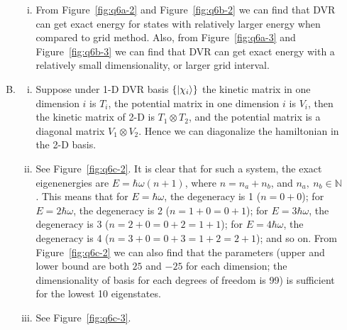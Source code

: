 \documentclass{article}
\newcommand{\set}[1]{\ensuremath{\left\{{#1}\right\}}}
\begin{document}
\begin{enumerate}[1.]
\begin{enumerate}[(A)]
\begin{enumerate}[(i)]
      \item From Figure~\ref{fig:q6a-2} and Figure~\ref{fig:q6b-2} we can find that DVR can get exact energy for states with relatively larger energy when compared to grid method. Also, from Figure~\ref{fig:q6a-3} and Figure~\ref{fig:q6b-3} we can find that DVR can get exact energy with a relatively small dimensionality, or larger grid interval.
    \end{enumerate}

    \item
    \begin{enumerate}[(i)]
      \item Suppose under 1-D DVR basis $\set{\ket{\chi_i}}$ the kinetic matrix in one dimension $i$ is $T_i$, the potential matrix in one dimension $i$ is $V_i$, then the kinetic matrix of 2-D is $T_1 \otimes T_2$, and the potential matrix is a diagonal matrix $V_1 \otimes V_2$. Hence we can diagonalize the hamiltonian in the 2-D basis.
      \item See Figure~\ref{fig:q6c-2}. It is clear that for such a system, the exact eigenenergies are $E = \hbar\omega(n + 1)$, where $n = n_a + n_b$, and $n_a,\ n_b \in \mathbb{N}$. This means that for $E = \hbar\omega$, the degeneracy is 1 ($n = 0 + 0$); for $E = 2\hbar\omega$, the degeneracy is 2 ($n = 1 + 0 = 0 + 1$); for $E = 3\hbar\omega$, the degeneracy is 3 ($n = 2 + 0 = 0 + 2 = 1 + 1$); for $E = 4\hbar\omega$, the degeneracy is 4 ($n = 3 + 0 = 0 + 3 = 1 + 2 = 2 + 1$); and so on.
      From Figure~\ref{fig:q6c-2} we can also find that the parameters (upper and lower bound are both $25$ and $-25$ for each dimension; the dimensionality of basis for each degrees of freedom is 99) is sufficient for the lowest 10 eigenstates.

      \item See Figure~\ref{fig:q6c-3}.


\end{enumerate}
\end{enumerate}
\end{enumerate}
\end{document}
